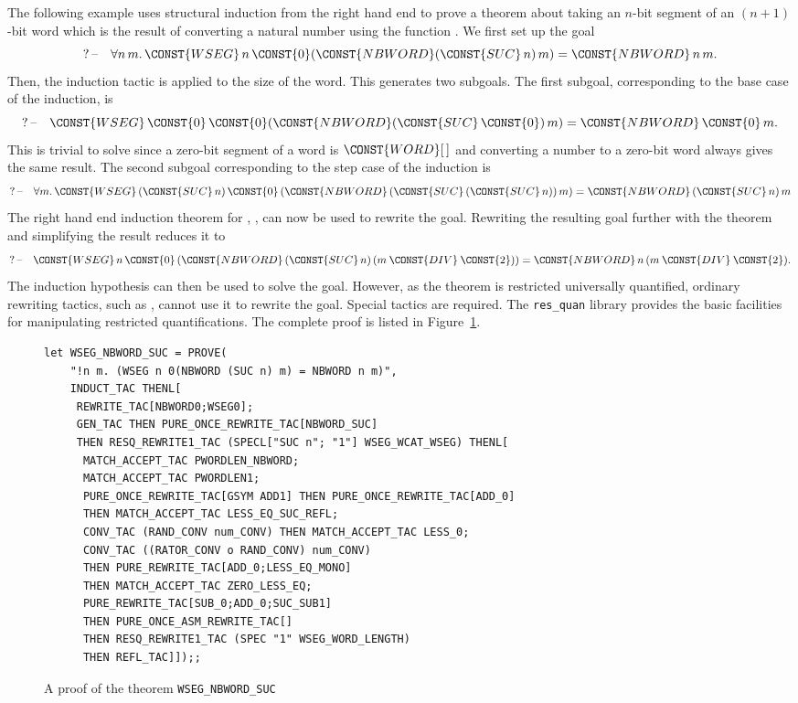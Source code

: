 The following example uses structural induction from the right hand
end to prove a theorem about taking an $n$-bit segment of an
$(n + 1)$-bit word which is the result of converting a natural number
using the function . We first set up the goal
\[
\GOAL \FORALL n\,m\DOT \CONST{WSEG}\,n\,\CONST{0}(\CONST{NBWORD}(\CONST{SUC}\,n)\,m)
= \CONST{NBWORD}\,n\,m.
\]
Then, the induction tactic  is applied to the size
of the word. This generates two subgoals. The first subgoal,
corresponding to the base case of the induction, is
\[
\GOAL \CONST{WSEG}\,\CONST{0}\,\CONST{0}(\CONST{NBWORD}(\CONST{SUC}\,\CONST{0})\,m)
= \CONST{NBWORD}\,\CONST{0}\,m.
\]
This is trivial to solve since a zero-bit segment of a word is
$\CONST{WORD}[\,]$ and converting a number to a zero-bit word always
gives the same result.
The second subgoal corresponding to the step case of the induction is
\[
\GOAL \FORALL m\DOT
    \CONST{WSEG} \,(\CONST{SUC} \,n) \,\CONST{0}
       \,(\CONST{NBWORD} \,(\CONST{SUC} \,(\CONST{SUC} \,n)) \,m) =
       \CONST{NBWORD} \,(\CONST{SUC} \,n) \,m
\]
The right hand end induction theorem for ,
, can now be used to rewrite the goal.
Rewriting the resulting goal further with the theorem
 and simplifying the result reduces it to
\[
\GOAL\CONST{WSEG} \,n \,\CONST{0} \,(\CONST{NBWORD} \,(\CONST{SUC} \,n)
                                   \,(m \:\CONST{DIV}\: \CONST{2})) =
    \CONST{NBWORD} \,n \,(m \:\CONST{DIV}\: \CONST{2}).
\]
The induction hypothesis can then be used to solve the goal. However,
as the theorem  is restricted universally
quantified, ordinary rewriting tactics, such as ,
cannot use it to rewrite the goal. Special tactics are required. The
{\tt res\_quan} library provides the basic facilities for manipulating
restricted quantifications\cite{WW:res_quan-manual}.
The complete proof is listed in Figure~\ref{fig-WSEG_NBWORD_SUC}.
\begin{figure}
\begin{center}\small
\makeatletter
\def\verbatim@font{\small\tt}
\makeatother
\begin{verbatim}
let WSEG_NBWORD_SUC = PROVE(
    "!n m. (WSEG n 0(NBWORD (SUC n) m) = NBWORD n m)",
    INDUCT_TAC THENL[
     REWRITE_TAC[NBWORD0;WSEG0];
     GEN_TAC THEN PURE_ONCE_REWRITE_TAC[NBWORD_SUC]
     THEN RESQ_REWRITE1_TAC (SPECL["SUC n"; "1"] WSEG_WCAT_WSEG) THENL[
      MATCH_ACCEPT_TAC PWORDLEN_NBWORD;
      MATCH_ACCEPT_TAC PWORDLEN1;
      PURE_ONCE_REWRITE_TAC[GSYM ADD1] THEN PURE_ONCE_REWRITE_TAC[ADD_0]
      THEN MATCH_ACCEPT_TAC LESS_EQ_SUC_REFL;
      CONV_TAC (RAND_CONV num_CONV) THEN MATCH_ACCEPT_TAC LESS_0;
      CONV_TAC ((RATOR_CONV o RAND_CONV) num_CONV)
      THEN PURE_REWRITE_TAC[ADD_0;LESS_EQ_MONO]
      THEN MATCH_ACCEPT_TAC ZERO_LESS_EQ;
      PURE_REWRITE_TAC[SUB_0;ADD_0;SUC_SUB1]
      THEN PURE_ONCE_ASM_REWRITE_TAC[]
      THEN RESQ_REWRITE1_TAC (SPEC "1" WSEG_WORD_LENGTH)
      THEN REFL_TAC]]);;
\end{verbatim}
\end{center}
\caption{A proof of the theorem {\tt WSEG\_NBWORD\_SUC}\label{fig-WSEG_NBWORD_SUC}}
\end{figure}

